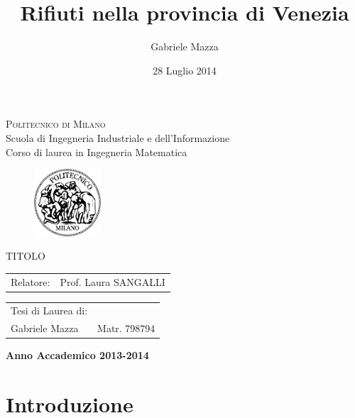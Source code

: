 \documentclass[a4paper,11pt,twoside,openright]{book}							%
\date{28 Luglio 2014}
\author{Gabriele Mazza}
\title{Rifiuti nella provincia di Venezia}
\begin{document}

\thispagestyle{empty}
\enlargethispage{60mm}
\begin{center}
\Large{\textsc{Politecnico di Milano}}\\
\large{Scuola di Ingegneria Industriale e dell'Informazione}\\
\large{Corso di laurea in Ingegneria Matematica}\\
\vspace{10mm}
\begin{figure}[h]
	\begin{center}
	\includegraphics[width=25mm]{Immagini/Logo.png}
	\end{center}
	\end{figure}
\vspace{5mm}

\begin{LARGE}
TITOLO
\end{LARGE}
\vspace{30mm}

\begin{flushleft}
\begin{tabular}{l l }
Relatore:    & Prof. Laura SANGALLI
\end{tabular}
\end{flushleft}
\vspace{30mm}

\begin{flushright}
\begin{tabular}{l l }
Tesi di Laurea di: & \\
Gabriele Mazza & Matr. 798794 \\
\end{tabular}
\end{flushright}
\vfill
{\large{\bf Anno Accademico 2013-2014}}
\end{center}

\tableofcontents

\chapter*{Introduzione}
\label{Cap:intro}
\end{document}
